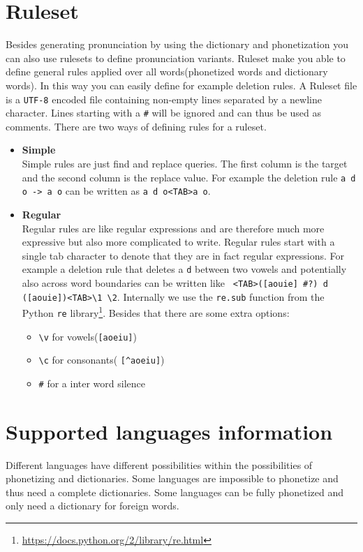 \section{Ruleset}
Besides generating pronunciation by using the dictionary and phonetization you
can also use rulesets to define pronunciation variants. Ruleset make you able
to define general rules applied over all words(phonetized words and dictionary
words). In this way you can easily define for example deletion rules.
A Ruleset file is a \texttt{UTF-8} encoded
file containing non-empty lines separated by a newline character. Lines
starting with a \texttt{\#} will be ignored and can thus be used as comments.
There are two ways of defining rules for a ruleset.
\begin{itemize}
	\item \textbf{Simple}\\
		Simple rules are just find and replace queries. The first column is the
		target and the second column is the replace value. For example the deletion
		rule \texttt{a d o -> a o} can be written as \texttt{a d o<TAB>a o}.
	\item \textbf{Regular}\\
		Regular rules are like regular expressions and are therefore much more
		expressive but also more complicated to write. Regular rules start with a
		single tab character to denote that they are in fact regular expressions.
		For example a deletion rule that deletes a \texttt{d} between two vowels
		and potentially also across word boundaries can be written like \texttt{%
		<TAB>([aouie] \#?) d ([aouie])<TAB>\textbackslash 1 \textbackslash 2}.
		Internally we use the \texttt{re.sub} function from the Python \texttt{re}
		library\footnote{\url{https://docs.python.org/2/library/re.html}}. Besides
		that there are some extra options:
		\begin{itemize}
			\item \texttt{\textbackslash v} for vowels(\texttt{[aoeiu]})
			\item \texttt{\textbackslash c} for consonants(%
				\texttt{[\textasciicircum aoeiu]})
			\item \texttt{\#} for a inter word silence
		\end{itemize}
\end{itemize}

\section{Supported languages information}
Different languages have different possibilities within the possibilities of
phonetizing and dictionaries. Some languages are impossible to phonetize and
thus need a complete dictionaries. Some languages can be fully phonetized and
only need a dictionary for foreign words.

